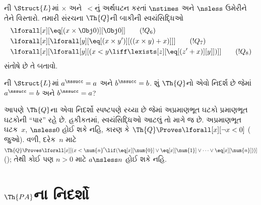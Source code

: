 \begin{prob}
ની $\Struct{L}$માં $\times$
અને~$<$નું અર્થઘટન કરતાં $\nstimes$ અને $\nsless$ ઉમેરીને તેને
વિસ્તારો. તમારી સંરચના $\Th{Q}$ની બાકીની સ્વયંસિદ્ધિઓ
\begin{align*}
& \lforall[x][\eq[(x \times \Obj 0)][\Obj 0]] \tag{$!Q_6$}\\ &
  \lforall[x][\lforall[y][\eq[(x \times y')][((x \times y) + x)]]]
  \tag{$!Q_7$}\\ & \lforall[x][\lforall[y][(x < y \liff \lexists[z][\eq[(z'+x)][y]])]] \tag{$!Q_8$}
\end{align*}
સંતોષે છે તે બતાવો.
\end{prob}

\begin{prob}
ની $\Struct{L}$માં
$a^\nssucc=a$ અને $b^\nssucc=b$. શું $\Th{Q}$નો એવો નિદર્શ છે જેમાં
$a^\nssucc=b$ અને $b^\nssucc=a$?
\end{prob}

\begin{explain}
આપણે $\Th{Q}$ના એવા નિદર્શો સ્પષ્ટપણે રચ્યા છે જેમાં અપ્રમાણભૂત
ઘટકો પ્રમાણભૂત ઘટકોની ``પાર'' રહે છે. હકીકતમાં, સ્વયંસિદ્ધિઓ
આટલું તો માગે જ છે. અપ્રમાણભૂત ઘટક~$x$, ${}\nsless0$ હોઈ શકે
નહિ, કારણ કે $\Th{Q}\Proves\lforall[x][\lnot x<0]$
( જુઓ). વળી, દરેક~$n$ માટે
$\Th{Q}\Proves\lforall[x][(x<\num{n}'\lif
(\eq[x][\num{0}]\lor\eq[x][\num{1}]\lor\dots\lor
\eq[x][\num{n}]))]$
(); તેથી કોઈ પણ $n>0$ માટે
$a\nsless n$ હોઈ શકે નહિ.
\end{explain}
\endgroup


\begingroup
\makeatletter{}\makeatother

\section{$\Th{PA}$ના નિદર્શો}
\label{guunit:OLP-0196}


